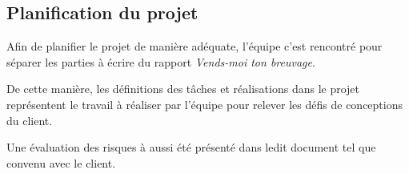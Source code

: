 \subsection{Planification du projet}
Afin de planifier le projet de manière adéquate,
l'équipe c'est rencontré pour séparer les parties à écrire du rapport \textit{Vends-moi ton breuvage}.

De cette manière, les définitions des tâches et réalisations dans le projet représentent le travail à réaliser par l'équipe pour relever les défis de conceptions du client.

Une évaluation des risques à aussi été présenté dans ledit document tel que convenu avec le client.

